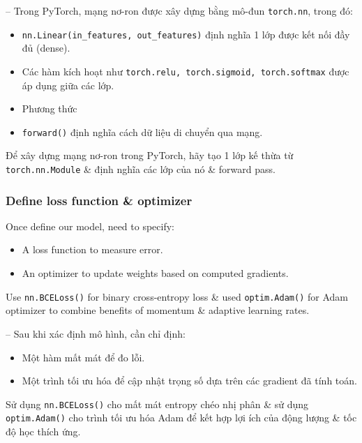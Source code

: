 \documentclass{article}
\begin{document}
-- Trong PyTorch, mạng nơ-ron được xây dựng bằng mô-đun {\tt torch.nn}, trong đó:
\begin{itemize}
    \item \verb|nn.Linear(in_features, out_features)| định nghĩa 1 lớp được kết nối đầy đủ (dense).
    \item Các hàm kích hoạt như {\tt torch.relu, torch.sigmoid, torch.softmax} được áp dụng giữa các lớp.
    \item Phương thức \item {\tt forward()} định nghĩa cách dữ liệu di chuyển qua mạng.
\end{itemize}
Để xây dựng mạng nơ-ron trong PyTorch, hãy tạo 1 lớp kế thừa từ {\tt torch.nn.Module} \& định nghĩa các lớp của nó \& forward pass.


\subsubsection{Define loss function \& optimizer}
Once define our model, need to specify:
\begin{itemize}
    \item A loss function to measure error.
    \item An optimizer to update weights based on computed gradients.
\end{itemize}
Use {\tt nn.BCELoss()} for binary cross-entropy loss \& used {\tt optim.Adam()} for Adam optimizer to combine benefits of momentum \& adaptive learning rates.

-- Sau khi xác định mô hình, cần chỉ định:
\begin{itemize}
    \item Một hàm mất mát để đo lỗi.
    \item Một trình tối ưu hóa để cập nhật trọng số dựa trên các gradient đã tính toán.
\end{itemize}
Sử dụng {\tt nn.BCELoss()} cho mất mát entropy chéo nhị phân \& sử dụng {\tt optim.Adam()} cho trình tối ưu hóa Adam để kết hợp lợi ích của động lượng \& tốc độ học thích ứng.

\end{document}
